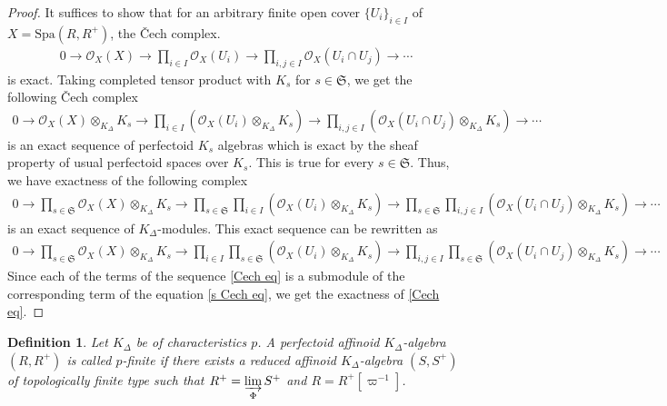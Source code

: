 \documentclass[12pts,a4paper]{amsart}
\newtheorem{definition}[proposition]{Definition}
\begin{document}
\begin{proof}
     It suffices to show that for an arbitrary finite open cover $\{U_i\}_{i\in I}$ of $X=\mathrm{Spa}(R,R^+)$, the \v{C}ech complex.
\begin{align}\label{Cech eq}
0\to\mathcal{O}_X(X)\to \prod\limits_{i\in I}\mathcal{O}_X(U_i)\to \prod\limits_{i,j\in I}\mathcal{O}_X(U_i\cap U_j)\to\cdots
\end{align}
is exact. Taking completed tensor product with $K_s$ for $s\in\mathfrak{S}$, we get the following \v{C}ech complex
\begin{align*}
0\to\mathcal{O}_X(X)\otimes_{K_\Delta}K_s\to \prod\limits_{i\in I}(\mathcal{O}_X(U_i)\otimes_{K_\Delta} K_s)\to \prod\limits_{i,j\in I}(\mathcal{O}_X(U_i\cap U_j)\otimes_{K_\Delta} K_s)\to\cdots
\end{align*}
is an exact sequence of perfectoid $K_s$ algebras which is exact by the sheaf property of usual perfectoid spaces over $K_s$. This is true for every $s\in\mathfrak{S}$. Thus, we have exactness of the following complex
\begin{align*}
  0\to\prod\limits_{s\in\mathfrak{S}}\mathcal{O}_X(X)\otimes_{K_\Delta}K_s\to \prod\limits_{s\in\mathfrak{S}}\prod\limits_{i\in I}(\mathcal{O}_X(U_i)\otimes_{K_\Delta} K_s)\to \prod\limits_{s\in\mathfrak{S}}\prod\limits_{i,j\in I}(\mathcal{O}_X(U_i\cap U_j)\otimes_{K_\Delta} K_s)\to\cdots
\end{align*}
is an exact sequence of $K_\Delta$-modules. This exact sequence can be rewritten as 
\begin{align*}\label{s Cech eq}
  0\to\prod\limits_{s\in\mathfrak{S}}\mathcal{O}_X(X)\otimes_{K_\Delta}K_s\to \prod\limits_{i\in I}\prod\limits_{s\in\mathfrak{S}}(\mathcal{O}_X(U_i)\otimes_{K_\Delta} K_s)\to \prod\limits_{i,j\in I}\prod\limits_{s\in\mathfrak{S}}(\mathcal{O}_X(U_i\cap U_j)\otimes_{K_\Delta} K_s)\to\cdots
\end{align*}
Since each of the terms of the sequence \ref{Cech eq} is a submodule of the corresponding term of the equation \ref{s Cech eq}, we get the exactness of \ref{Cech eq}.
\end{proof}

\begin{definition}
    Let $K_\Delta$ be of characteristics $p$. A perfectoid affinoid $K_\Delta$-algebra $(R,R^+)$ is called \emph{$p$-finite} if there exists a reduced affinoid $K_\Delta$-algebra $(S,S^+)$ of topologically finite type such that $R^+=\varinjlim\limits_{\Phi}S^+$ and $R=R^+[\varpi^{-1}]$.
\end{definition}
\end{document}
